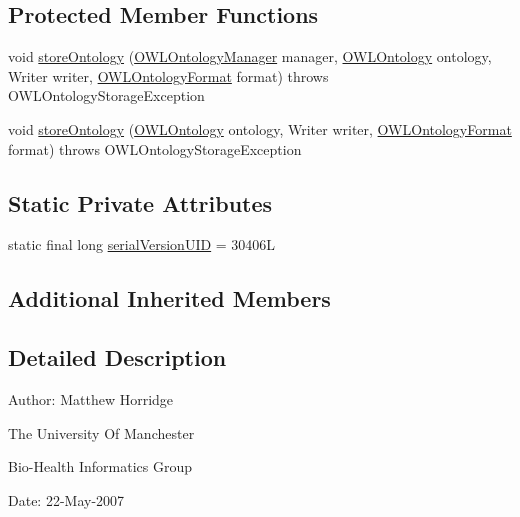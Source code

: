 \subsection*{Protected Member Functions}
\begin{DoxyCompactItemize}
\item 
void \hyperlink{classuk_1_1ac_1_1manchester_1_1cs_1_1owl_1_1owlapi_1_1mansyntaxrenderer_1_1_manchester_o_w_l_syntax_ontology_storer_a07a1c9801eedd8078391c2ea80187f35}{store\-Ontology} (\hyperlink{interfaceorg_1_1semanticweb_1_1owlapi_1_1model_1_1_o_w_l_ontology_manager}{O\-W\-L\-Ontology\-Manager} manager, \hyperlink{interfaceorg_1_1semanticweb_1_1owlapi_1_1model_1_1_o_w_l_ontology}{O\-W\-L\-Ontology} ontology, Writer writer, \hyperlink{classorg_1_1semanticweb_1_1owlapi_1_1model_1_1_o_w_l_ontology_format}{O\-W\-L\-Ontology\-Format} format)  throws O\-W\-L\-Ontology\-Storage\-Exception 
\item 
void \hyperlink{classuk_1_1ac_1_1manchester_1_1cs_1_1owl_1_1owlapi_1_1mansyntaxrenderer_1_1_manchester_o_w_l_syntax_ontology_storer_ae9904921c00040d573a8a4361e1ec84f}{store\-Ontology} (\hyperlink{interfaceorg_1_1semanticweb_1_1owlapi_1_1model_1_1_o_w_l_ontology}{O\-W\-L\-Ontology} ontology, Writer writer, \hyperlink{classorg_1_1semanticweb_1_1owlapi_1_1model_1_1_o_w_l_ontology_format}{O\-W\-L\-Ontology\-Format} format)  throws O\-W\-L\-Ontology\-Storage\-Exception 
\end{DoxyCompactItemize}
\subsection*{Static Private Attributes}
\begin{DoxyCompactItemize}
\item 
static final long \hyperlink{classuk_1_1ac_1_1manchester_1_1cs_1_1owl_1_1owlapi_1_1mansyntaxrenderer_1_1_manchester_o_w_l_syntax_ontology_storer_a6165de32fbe32df06f6b994f85591a82}{serial\-Version\-U\-I\-D} = 30406\-L
\end{DoxyCompactItemize}
\subsection*{Additional Inherited Members}


\subsection{Detailed Description}
Author\-: Matthew Horridge\par
 The University Of Manchester\par
 Bio-\/\-Health Informatics Group\par
 Date\-: 22-\/\-May-\/2007\par
\par
 

